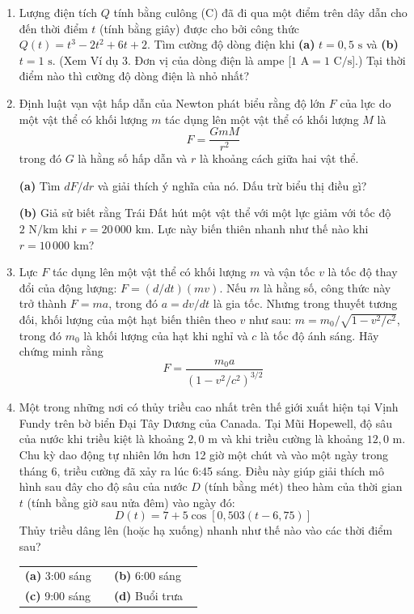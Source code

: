 \begin{minipage}[t]{0.48\textwidth}
\begin{enumerate}[label=\textbf{\arabic*.}, leftmargin=1.8em, itemsep=7pt, parsep=0pt, topsep=0pt, start=21]

\item Lượng điện tích $Q$ tính bằng culông (C) đã đi qua một điểm trên dây dẫn cho đến thời điểm $t$ (tính bằng giây) được cho bởi công thức $Q(t) = t^3 - 2t^2 + 6t + 2$. Tìm cường độ dòng điện khi \textbf{(a)} $t = 0{,}5\text{ s}$ và \textbf{(b)} $t = 1\text{ s}$. (Xem Ví dụ 3. Đơn vị của dòng điện là ampe [$1\text{ A} = 1\text{ C/s}$].) Tại thời điểm nào thì cường độ dòng điện là nhỏ nhất?

\item Định luật vạn vật hấp dẫn của Newton phát biểu rằng độ lớn $F$ của lực do một vật thể có khối lượng $m$ tác dụng lên một vật thể có khối lượng $M$ là
\[
F = \frac{GmM}{r^2}
\]
trong đó $G$ là hằng số hấp dẫn và $r$ là khoảng cách giữa hai vật thể.
\par\vspace{3pt}
\textbf{(a)} Tìm $dF/dr$ và giải thích ý nghĩa của nó. Dấu trừ biểu thị điều gì?
\par\vspace{3pt}
\textbf{(b)} Giả sử biết rằng Trái Đất hút một vật thể với một lực giảm với tốc độ $2\text{ N/km}$ khi $r = 20\,000\text{ km}$. Lực này biến thiên nhanh như thế nào khi $r = 10\,000\text{ km}$?

\item Lực $F$ tác dụng lên một vật thể có khối lượng $m$ và vận tốc $v$ là tốc độ thay đổi của động lượng: $F = (d/dt)(mv)$. Nếu $m$ là hằng số, công thức này trở thành $F = ma$, trong đó $a = dv/dt$ là gia tốc. Nhưng trong thuyết tương đối, khối lượng của một hạt biến thiên theo $v$ như sau: $m = m_0/\sqrt{1 - v^2/c^2}$, trong đó $m_0$ là khối lượng của hạt khi nghỉ và $c$ là tốc độ ánh sáng. Hãy chứng minh rằng
\[
F = \frac{m_0 a}{(1 - v^2/c^2)^{3/2}}
\]

\item Một trong những nơi có thủy triều cao nhất trên thế giới xuất hiện tại Vịnh Fundy trên bờ biển Đại Tây Dương của Canada. Tại Mũi Hopewell, độ sâu của nước khi triều kiệt là khoảng $2{,}0\text{ m}$ và khi triều cường là khoảng $12{,}0\text{ m}$. Chu kỳ dao động tự nhiên lớn hơn 12 giờ một chút và vào một ngày trong tháng 6, triều cường đã xảy ra lúc 6:45 sáng. Điều này giúp giải thích mô hình sau đây cho độ sâu của nước $D$ (tính bằng mét) theo hàm của thời gian $t$ (tính bằng giờ sau nửa đêm) vào ngày đó:
\[
D(t) = 7 + 5\cos[0{,}503(t - 6{,}75)]
\]
Thủy triều dâng lên (hoặc hạ xuống) nhanh như thế nào vào các thời điểm sau?
\par\vspace{3pt}
\begin{tabular}{@{}p{0.45\linewidth}@{}p{0.45\linewidth}@{}}
\textbf{(a)} 3:00 sáng & \textbf{(b)} 6:00 sáng \\
\textbf{(c)} 9:00 sáng & \textbf{(d)} Buổi trưa
\end{tabular}


\end{enumerate}
\end{minipage}
